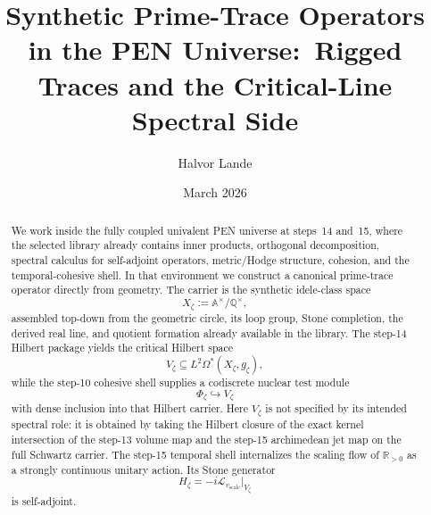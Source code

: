 \documentclass[11pt,a4paper]{article}
\title{\textbf{Synthetic Prime-Trace Operators in the PEN Universe:\
Rigged Traces and the Critical-Line Spectral Side}}
\author{Halvor Lande}
\date{March 2026}
\theoremstyle{plain}
\theoremstyle{definition}
\newcommand{\Q}{\mathbb{Q}}
\newcommand{\R}{\mathbb{R}}
\newcommand{\A}{\mathbb{A}}
\begin{document}
\maketitle

\begin{abstract}
We work inside the fully coupled univalent PEN universe at steps~14 and~15, where the selected library already contains inner products, orthogonal decomposition, spectral calculus for self-adjoint operators, metric/Hodge structure, cohesion, and the temporal-cohesive shell. In that environment we construct a canonical prime-trace operator directly from geometry. The carrier is the synthetic idele-class space
\[
  X_{\zeta}:=\A^{\times}/\Q^{\times},
\]
assembled top-down from the geometric circle, its loop group, Stone completion, the derived real line, and quotient formation already available in the library. The step-14 Hilbert package yields the critical Hilbert space
\[
  V_{\zeta}\subseteq L^2\Omega^*(X_{\zeta},g_{\zeta}),
\]
while the step-10 cohesive shell supplies a codiscrete nuclear test module
\[
  \Phi_{\zeta}\hookrightarrow V_{\zeta}
\]
with dense inclusion into that Hilbert carrier. Here $V_{\zeta}$ is not specified by its intended spectral role: it is obtained by taking the Hilbert closure of the exact kernel intersection of the step-13 volume map and the step-15 archimedean jet map on the full Schwartz carrier. The step-15 temporal shell internalizes the scaling flow of $\R_{>0}$ as a strongly continuous unitary action. Its Stone generator
\[
  H_{\zeta}=-i\mathcal L_{v_{\mathrm{scale}}}\big|_{V_{\zeta}}
\]
is self-adjoint.


\end{abstract}
\end{document}
